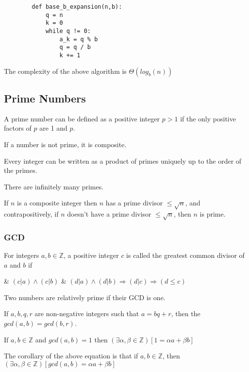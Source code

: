     \begin{verbatim}
        def base_b_expansion(n,b):
            q = n
            k = 0
            while q != 0:
                a_k = q % b
                q = q / b
                k += 1
    \end{verbatim}

    The complexity of the above algorithm is $\Theta(log_b(n))$

    \subsection{Prime Numbers}
    A prime number can be defined as a positive integer $p > 1$ if the only positive factors of $p$ are 1 and $p$.

    If a number is not prime, it is composite.

    Every integer can be written as a product of primes uniquely up to the order of the primes.

    There are infinitely many primes.

    If $n$ is a composite integer then $n$ has a prime divisor $\le \sqrt{n}$, and contrapositively, if $n$ doesn't have a prime divisor $\le \sqrt{n}$, then $n$ is prime.

        \subsubsection{GCD}
        For integers $a,b \in \mathbb{Z}$, a positive integer $c$ is called the greatest common divisor of $a$ and $b$ if
        \NewList
        \begin{easylist}
            & $(c \vert a) \wedge (c \vert b)$
            & $(d \vert a) \wedge (d \vert b) \Rightarrow (d \vert c) \Rightarrow (d \le c)$
        \end{easylist}

        Two numbers are relatively prime if their GCD is one.

        If $a, b, q, r$ are non-negative integers such that $a = bq + r$, then the $gcd(a,b) = gcd(b,r)$.

        If $a,b \in \mathbb{Z}$ and $gcd(a,b)=1$ then
        $\left( \exists \alpha, \beta \in \mathbb{Z} \right)\left[ 1 = \alpha a + \beta b \right]$

        The corollary of the above equation is that if $a,b \in \mathbb{Z}$, then $\left( \exists \alpha, \beta \in \mathbb{Z} \right) \left[ gcd(a,b) = \alpha a + \beta b \right]$

